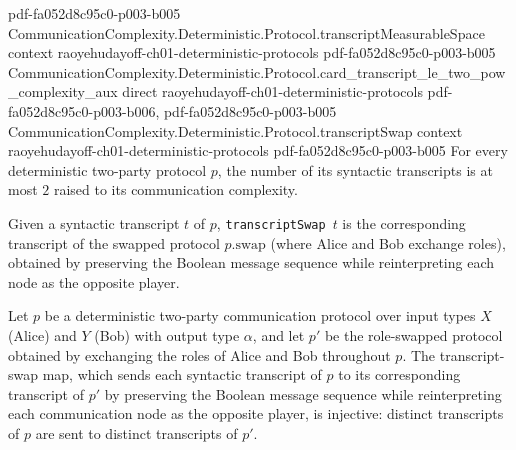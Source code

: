 \begin{theorem}
  {pdf-fa052d8c95c0-p003-b005}
\proofstep
  {CommunicationComplexity.Deterministic.Protocol.transcriptMeasurableSpace}
  {context}
  {raoyehudayoff-ch01-deterministic-protocols}
  {pdf-fa052d8c95c0-p003-b005}
\proofstep
  {CommunicationComplexity.Deterministic.Protocol.card_transcript_le_two_pow_complexity_aux}
  {direct}
  {raoyehudayoff-ch01-deterministic-protocols}
  {pdf-fa052d8c95c0-p003-b006,
    pdf-fa052d8c95c0-p003-b005}
\proofstep
  {CommunicationComplexity.Deterministic.Protocol.transcriptSwap}
  {context}
  {raoyehudayoff-ch01-deterministic-protocols}
  {pdf-fa052d8c95c0-p003-b005}
For every deterministic two-party protocol $p$, the number of its syntactic transcripts
is at most $2$ raised to its communication complexity.
\end{theorem}

\begin{definition}
\label{CommunicationComplexity.Deterministic.Protocol.transcriptSwap}
\leanok
{}
Given a syntactic transcript $t$ of $p$, \texttt{transcriptSwap}~$t$ is the corresponding
transcript of the swapped protocol $p.\mathrm{swap}$ (where Alice and Bob exchange
roles), obtained by preserving the Boolean message sequence while reinterpreting each
node as the opposite player.
\end{definition}

\begin{theorem}
\label{CommunicationComplexity.Deterministic.Protocol.transcriptSwap_injective}
\leanok
{}
Let $p$ be a deterministic two-party communication protocol over input types $X$ (Alice)
and $Y$ (Bob) with output type $\alpha$, and let $p'$ be the role-swapped protocol
obtained by exchanging the roles of Alice and Bob throughout $p$. The transcript-swap
map, which sends each syntactic transcript of $p$ to its corresponding transcript of
$p'$ by preserving the Boolean message sequence while reinterpreting each communication
node as the opposite player, is injective: distinct transcripts of $p$ are sent to
distinct transcripts of $p'$.
\end{theorem}

